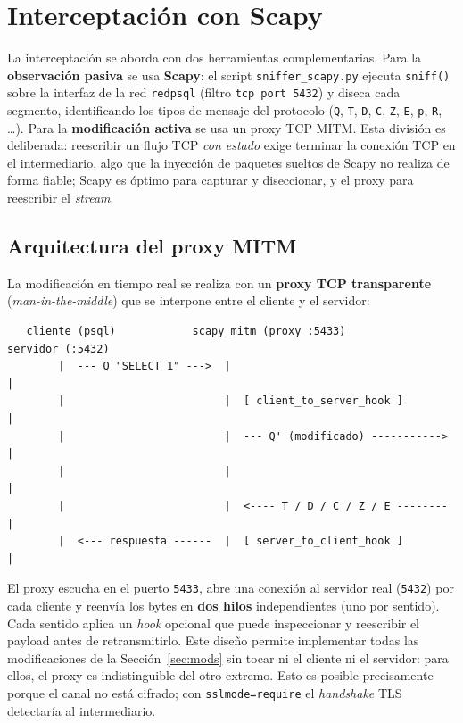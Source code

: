 \documentclass[11pt]{article}
\begin{document}
\section{Interceptación con Scapy}

La interceptación se aborda con dos herramientas complementarias. Para la
\textbf{observación pasiva} se usa \textbf{Scapy}: el script
\texttt{sniffer\_scapy.py} ejecuta \texttt{sniff()} sobre la interfaz de la red
\texttt{redpsql} (filtro \texttt{tcp port 5432}) y diseca cada segmento,
identificando los tipos de mensaje del protocolo (\texttt{Q}, \texttt{T},
\texttt{D}, \texttt{C}, \texttt{Z}, \texttt{E}, \texttt{p}, \texttt{R}, \dots).
Para la \textbf{modificación activa} se usa un proxy TCP MITM. Esta división es
deliberada: reescribir un flujo TCP \emph{con estado} exige terminar la conexión
TCP en el intermediario, algo que la inyección de paquetes sueltos de Scapy no
realiza de forma fiable; Scapy es óptimo para capturar y diseccionar, y el proxy
para reescribir el \emph{stream}.

\subsection{Arquitectura del proxy MITM}
La modificación en tiempo real se realiza con un \textbf{proxy TCP transparente}
(\emph{man-in-the-middle}) que se interpone entre el cliente y el servidor:

\begin{center}
\begin{minipage}{0.92\linewidth}
\begin{verbatim}
   cliente (psql)            scapy_mitm (proxy :5433)            servidor (:5432)
        |  --- Q "SELECT 1" --->  |                                   |
        |                         |  [ client_to_server_hook ]        |
        |                         |  --- Q' (modificado) ----------->  |
        |                         |                                   |
        |                         |  <---- T / D / C / Z / E --------  |
        |  <--- respuesta ------  |  [ server_to_client_hook ]        |
\end{verbatim}
\end{minipage}
\end{center}

El proxy escucha en el puerto \texttt{5433}, abre una conexión al servidor real
(\texttt{5432}) por cada cliente y reenvía los bytes en \textbf{dos hilos}
independientes (uno por sentido). Cada sentido aplica un \emph{hook} opcional que
puede inspeccionar y reescribir el payload antes de retransmitirlo. Este diseño
permite implementar todas las modificaciones de la Sección~\ref{sec:mods} sin
tocar ni el cliente ni el servidor: para ellos, el proxy es indistinguible del
otro extremo. Esto es posible precisamente porque el canal no está cifrado;
con \texttt{sslmode=require} el \emph{handshake} TLS detectaría al intermediario.
\end{document}
